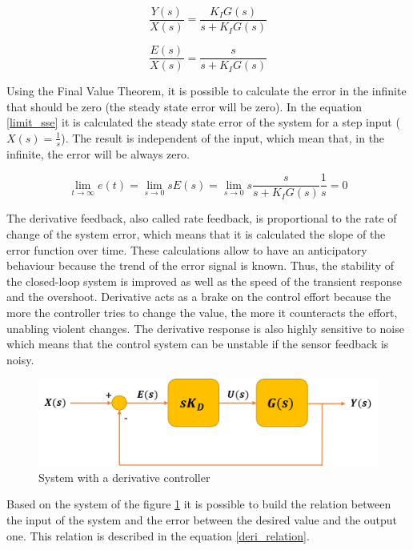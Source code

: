 \begin{equation}\label{int_TF}
\frac{Y(s)}{X(s)}= \frac{K_IG(s)}{s + K_IG(s)}
\end{equation}

\begin{equation}\label{int_error_input}
\frac{E(s)}{X(s)}= \frac{s}{s + K_IG(s)}
\end{equation}

Using the Final Value Theorem, it is possible to calculate the error in the infinite that should be zero (the steady state error will be zero). In the equation \ref{limit_sse} it is calculated the steady state error of the system for a step input ($X(s)=\frac{1}{s}$). The result is independent of the input, which mean that, in the infinite, the error will be always zero.

\begin{equation}\label{limit_sse}
\lim_{t\to\infty} e(t) = \lim_{s \to 0} sE(s) = \lim_{s \to 0} s\frac{s}{s + K_IG(s)}\frac{1}{s} = 0
\end{equation}

The derivative feedback, also called rate feedback, is proportional to the rate of change of the system error, which means that it is calculated the slope of the error function over time. These calculations allow to have an anticipatory behaviour because the trend of the error signal is known. Thus, the stability of the closed-loop system is improved as well as the speed of the transient response and the overshoot. Derivative acts as a brake on the control effort because the more the controller tries to change the value, the more it counteracts the effort, unabling violent changes. The derivative response is also highly sensitive to noise which means that the control system can be unstable if the sensor feedback is noisy. 

\begin{figure}[H]
	\centering
	\includegraphics[scale=0.6]{figures/deriv_controller.png}
	\caption{System with a derivative controller}
	\label{deriv_controller}
\end{figure}

Based on the system of the figure \ref{deriv_controller} it is possible to build the relation between the input of the system and the error between the desired value and the output one. This relation is described in the equation \ref{deri_relation}.

